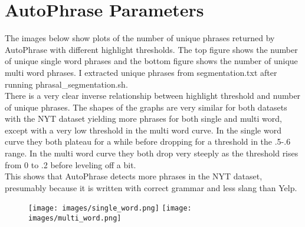 \documentclass{article}
\begin{document}
\section*{AutoPhrase Parameters}
The images below show plots of the number of unique phrases returned by AutoPhrase with different highlight thresholds.  The top figure shows the number of unique single word phrases and the bottom figure shows the number of unique multi word phrases.  I extracted unique phrases from segmentation.txt after running phrasal\_segmentation.sh.\\
There is a very clear inverse relationship between highlight threshold and number of unique phrases.  The shapes of the graphs are very similar for both datasets with the NYT dataset yielding more phrases for both single and multi word, except with a very low threshold in the multi word curve.  In the single word curve they both plateau for a while before dropping for a threshold in the .5-.6 range.  In the multi word curve they both drop very steeply as the threshold rises from 0 to .2 before leveling off a bit.\\
This shows that AutoPhrase detects more phrases in the NYT dataset, presumably because it is written with correct grammar and less slang than Yelp.
\begin{figure}[ht]
\centering
\texttt{[image: images/single\_word.png]}
\texttt{[image: images/multi\_word.png]}
\end{figure}
\end{document}
